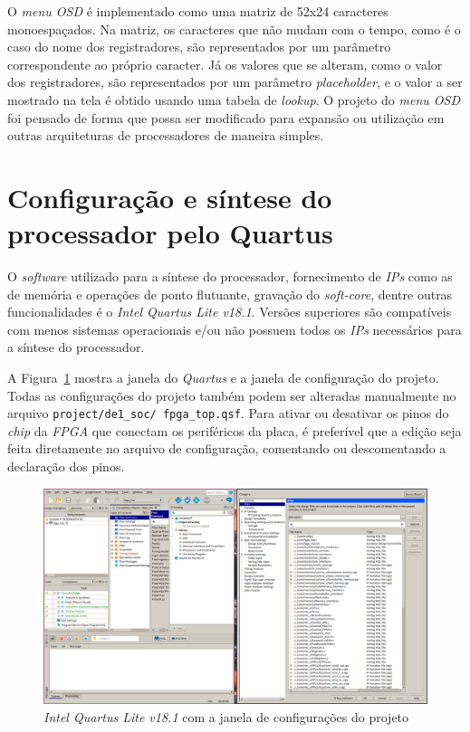     { O \textit{menu OSD} é implementado como uma matriz de 52x24 caracteres
        monoespaçados. Na matriz, os caracteres que não mudam com o tempo, como
        é o caso do nome dos registradores, são representados por um parâmetro
        correspondente ao próprio caracter. Já os valores que se alteram, como
        o valor dos registradores, são representados por um parâmetro
        \textit{placeholder}, e o valor a ser mostrado na tela é obtido usando
        uma tabela de \textit{lookup}. O projeto do \textit{menu OSD} foi pensado
        de forma que possa ser modificado para expansão ou utilização em outras
        arquiteturas de processadores de maneira simples.
    }

\section{Configuração e síntese do processador pelo Quartus}
    { O \textit{software} utilizado para a síntese do processador, fornecimento
        de \textit{IPs} como as de memória e operações de ponto flutuante,
        gravação do \textit{soft-core}, dentre outras funcionalidades é o
        \textit{Intel Quartus Lite v18.1}. Versões superiores são compatíveis com
        menos sistemas operacionais e/ou não possuem todos os \textit{IPs}
        necessários para a síntese do processador.
    }

    { A Figura~\ref{fig:quartus_files_config} mostra a janela do \textit{Quartus}
        e a janela de configuração do projeto. Todas as configurações do projeto
        também podem ser alteradas manualmente no arquivo
        \texttt{project/de1\_soc/ fpga\_top.qsf}. Para ativar ou desativar
        os pinos do \textit{chip} da \textit{FPGA} que conectam os periféricos
        da placa, é preferível que a edição seja feita diretamente no arquivo
        de configuração, comentando ou descomentando a declaração dos pinos.
    }

    \begin{figure}[H]
    \centering
        \includegraphics[width=.9\linewidth]{../images/quartus/files_config.png}
        \caption{\textit{Intel Quartus Lite v18.1} com a janela de configurações
            do projeto}\label{fig:quartus_files_config}
    \end{figure}


